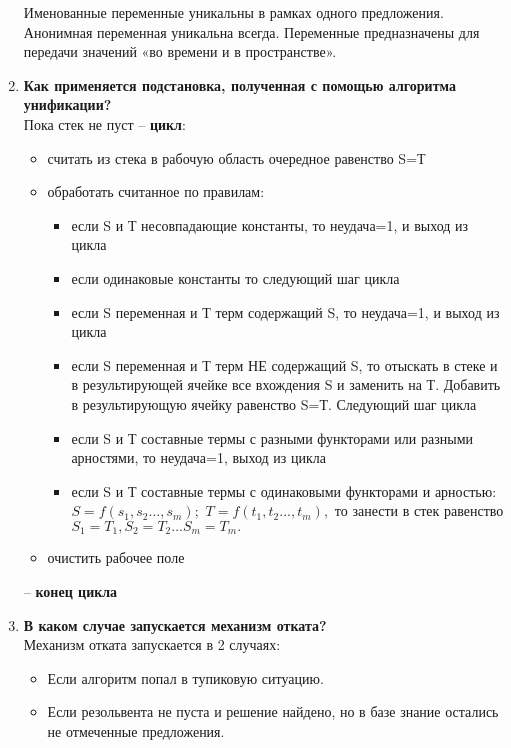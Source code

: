 \begin{enumerate}
   	Именованные переменные уникальны в рамках одного предложения. Анонимная переменная уникальна всегда. Переменные предназначены для передачи значений «во времени и в пространстве». 
    
    \item \textbf{\textbf{Как применяется подстановка, полученная с помощью алгоритма унификации?}}\\
   
   Пока стек не пуст – \textbf{цикл}:
   \begin{itemize}
   	\item	считать из стека в рабочую область очередное равенство S=Т
   	\item	обработать считанное по правилам:
   	\begin{itemize}
   		\item	если S и Т несовпадающие константы,			то неудача=1, и выход из цикла
   		\item	если одинаковые константы					то следующий шаг цикла
   		\item	если S переменная и Т терм содержащий S,		то неудача=1, и выход из цикла
   		\item	если S переменная и Т терм НЕ содержащий S,	то отыскать в стеке и в результирующей ячейке все вхождения S и заменить на Т. Добавить в результирующую ячейку равенство S=Т.  Следующий шаг цикла
   		\item	если S и Т составные термы с разными функторами или разными арностями, то неудача=1, выход из цикла
   		\item	если S и Т составные термы с одинаковыми функторами и арностью: $S=f(s_1,s_2 ...,s_m);$   $T=f(t_1,t_2 ...,t_m),$  то занести в стек равенство $S_1=T_1, S_2=T_2 ... S_m=T_m.$
   	\end{itemize}
   	\item	очистить рабочее поле
   \end{itemize}
   –  \textbf{конец цикла}
    
    \item \textbf{В каком случае запускается механизм отката?}\\
    Механизм отката запускается в 2 случаях:
    \begin{itemize}
    	\item Если алгоритм попал в тупиковую ситуацию. 
    	\item Если резольвента не пуста и решение найдено, но в базе знание остались не отмеченные предложения.
    \end{itemize}  
\end{enumerate}

